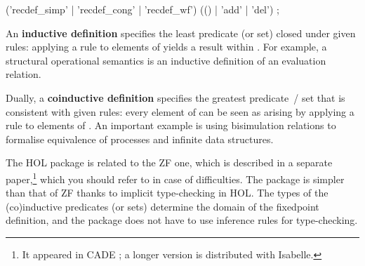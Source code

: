 \begin{isabellebody}
\begin{isamarkuptext}
  \begin{rail}
    ('recdef\_simp' | 'recdef\_cong' | 'recdef\_wf') (() | 'add' | 'del')
    ;
  \end{rail}%
\end{isamarkuptext}%
\isamarkuptrue%
%
\isamarkuptrue%
%
\begin{isamarkuptext}%
An \textbf{inductive definition} specifies the least predicate (or
  set)  closed under given rules: applying a rule to elements
  of  yields a result within .  For example, a
  structural operational semantics is an inductive definition of an
  evaluation relation.

  Dually, a \textbf{coinductive definition} specifies the greatest
  predicate~/ set  that is consistent with given rules: every
  element of  can be seen as arising by applying a rule to
  elements of .  An important example is using bisimulation
  relations to formalise equivalence of processes and infinite data
  structures.

  \medskip The HOL package is related to the ZF one, which is
  described in a separate paper,\footnote{It appeared in CADE
  \cite{paulson-CADE}; a longer version is distributed with Isabelle.}
  which you should refer to in case of difficulties.  The package is
  simpler than that of ZF thanks to implicit type-checking in HOL.
  The types of the (co)inductive predicates (or sets) determine the
  domain of the fixedpoint definition, and the package does not have
  to use inference rules for type-checking.


\end{isamarkuptext}
\end{isabellebody}
